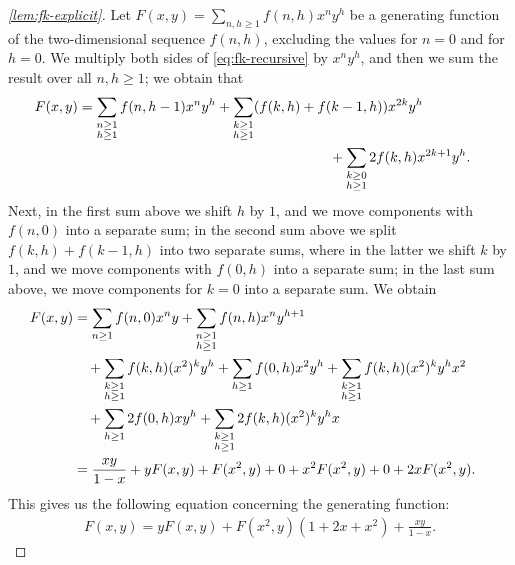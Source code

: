 \documentclass[envcountsect,envcountsame]{llncs}
\newcommand{\fk}{f}
\newcommand{\Fk}{F}
\begin{document}
	\begin{proof}[\cref{lem:fk-explicit}]
		Let $\Fk(x, y) = \sum_{n, h \geq 1} \fk(n, h) x^n y^h$ be a generating function of the two-dimensional sequence $\fk(n, h)$,
		excluding the values for $n = 0$ and for $h = 0$.
		We multiply both sides of \cref{eq:fk-recursive} by $x^n y^h$,
		and then we sum the result over all $n, h \geq 1$;
		we obtain that
		\begin{align*}
			\hspace{-1em}\Fk(x, y) & = \sum_{\substack{n \geq 1 \\ h \geq 1}} \fk(n, h - 1) x^n y^h + \sum_{\substack{k \geq 1 \\ h \geq 1}} (\fk(k, h) + \fk(k - 1, h)) x^{2 k} y^h\\
				&\hspace{18em} + \sum_{\substack{k \geq 0 \\ h \geq 1}} 2 \fk(k, h) x^{2 k + 1} y^h.
		\end{align*}
		Next, in the first sum above we shift $h$ by $1$, and we move components with $\fk(n,0)$ into a separate sum;
		in the second sum above we split $\fk(k, h) + \fk(k - 1, h)$ into two separate sums, where in the latter we shift $k$ by $1$,
		and we move components with $\fk(0,h)$ into a separate sum;
		in the last sum above, we move components for $k=0$ into a separate sum.
		We obtain
		\begin{align*}
			\hspace{-1em}\Fk(x, y) & = \sum_{n \geq 1} \fk(n, 0) x^n y + \sum_{\substack{n \geq 1 \\ h \geq 1}} \fk(n, h) x^n y^{h + 1}\\
				& \quad + \sum_{\substack{k \geq 1 \\ h \geq 1}} \fk(k, h) (x^2)^k y^h + \sum_{h \geq 1} \fk(0, h) x^2 y^h
					+ \sum_{\substack{k \geq 1 \\ h \geq 1}} \fk(k, h) (x^2)^k y^h x^2\\
				& \quad + \sum_{h \geq 1} 2 \fk(0, h) x y^h + \sum_{\substack{k \geq 1 \\ h \geq 1}} 2 \fk(k, h) (x^2)^k y^h x\\
				& = \frac{x y}{1 - x} + y \Fk(x, y) + \Fk(x^2, y) + 0 + x^2 \Fk(x^2, y) + 0 + 2 x \Fk(x^2, y).
		\end{align*}
		This gives us the following equation concerning the generating function:
		\begin{align}\label{F-func-equation}
			\Fk(x, y) = y \Fk(x, y) + \Fk(x^2, y) (1 + 2 x + x^2) + \frac{x y}{1 - x}.
		\end{align}


\end{proof}
\end{document}
